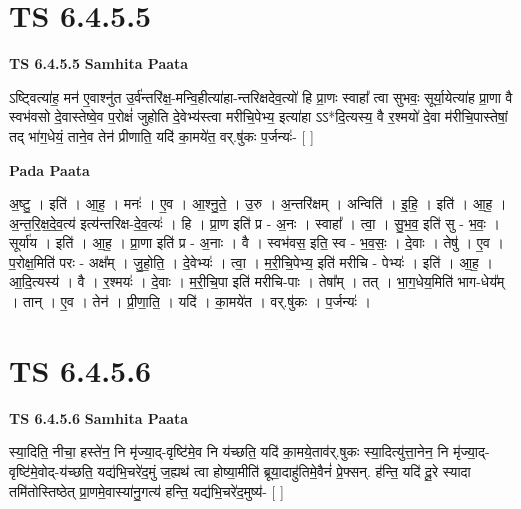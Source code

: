 \documentclass[17pt]{extarticle}
\begin{document}

\section{ TS 6.4.5.5 }

\textbf{TS 6.4.5.5 } \newline
\textbf{Samhita Paata} \newline

ऽष्ट्वित्या॑ह॒ मन॑ ए॒वाश्नु॑त उ॒र्व॑न्तरि॑क्ष॒-मन्वि॒हीत्या॑हा-न्तरिक्षदेव॒त्यो॑ हि प्रा॒णः स्वाहा᳚ त्वा सुभवः॒ सूर्या॒येत्या॑ह प्रा॒णा वै स्वभ॑वसो दे॒वास्तेष्वे॒व प॒रोक्षं॑ जुहोति दे॒वेभ्य॑स्त्वा मरीचि॒पेभ्य॒ इत्या॑हा ऽऽ*दि॒त्यस्य॒ वै र॒श्मयो॑ दे॒वा म॑रीचि॒पास्तेषां॒ तद् भा॑ग॒धेयं॒ ताने॒व तेन॑ प्रीणाति॒ यदि॑ का॒मये॑त॒ वर्.षु॑कः प॒र्जन्यः॑- [  ] \newline

\textbf{Pada Paata} \newline

अ॒ष्टु॒ । इति॑ । आ॒ह॒ । मनः॑ । ए॒व । आ॒श्नु॒ते॒ । उ॒रु । अ॒न्तरि॑क्षम् । अन्विति॑ । इ॒हि॒ । इति॑ । आ॒ह॒ । अ॒न्त॒रि॒क्ष॒दे॒व॒त्य॑ इत्य॑न्तरिक्ष-दे॒व॒त्यः॑ । हि । प्रा॒ण इति॑ प्र - अ॒नः । स्वाहा᳚ । त्वा॒ । सु॒भ॒व॒ इति॑ सु - भ॒वः॒ । सूर्या॑य । इति॑ । आ॒ह॒ । प्रा॒णा इति॑ प्र - अ॒नाः । वै । स्वभ॑वस॒ इति॒ स्व - भ॒व॒सः॒ । दे॒वाः । तेषु॑ । ए॒व । प॒रोक्ष॒मिति॑ परः - अक्ष᳚म् । जु॒हो॒ति॒ । दे॒वेभ्यः॑ । त्वा॒ । म॒री॒चि॒पेभ्य॒ इति॑ मरीचि - पेभ्यः॑ । इति॑ । आ॒ह॒ । आ॒दि॒त्यस्य॑ । वै । र॒श्मयः॑ । दे॒वाः । म॒री॒चि॒पा इति॑ मरीचि-पाः । तेषा᳚म् । तत् । भा॒ग॒धेय॒मिति॑ भाग-धेय᳚म् । तान् । ए॒व । तेन॑ । प्री॒णा॒ति॒ । यदि॑ । का॒मये॑त । वर्.षु॑कः । प॒र्जन्यः॑ ।  \newline





\section{ TS 6.4.5.6 }

\textbf{TS 6.4.5.6 } \newline
\textbf{Samhita Paata} \newline

स्या॒दिति॒ नीचा॒ हस्ते॑न॒ नि मृ॑ज्या॒द्-वृष्टि॑मे॒व नि य॑च्छति॒ यदि॑ का॒मये॒ताव॑र्.षुकः स्या॒दित्यु॑त्ता॒नेन॒ नि मृ॑ज्या॒द्-वृष्टि॑मे॒वोद्-य॑च्छति॒ यद्य॑भि॒चरे॑द॒मुं ज॒ह्यथ॑ त्वा होष्या॒मीति॑ ब्रूया॒दाहु॑तिमे॒वैनं॑ प्रे॒फ्सन्. ह॑न्ति॒ यदि॑ दू॒रे स्यादा तमि॑तोस्तिष्ठेत् प्रा॒णमे॒वास्या॑नु॒गत्य॑ हन्ति॒ यद्य॑भि॒चरे॑द॒मुष्य॑- [  ] \newline
\end{document}
